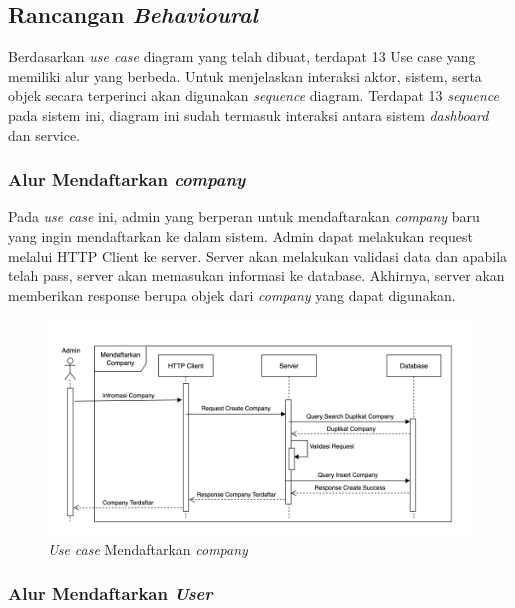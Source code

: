 \subsection{Rancangan \textit{Behavioural}}
\label{subsec:arsitektur-behavioural}

Berdasarkan \textit{use case} diagram yang telah dibuat, terdapat 13 Use case yang memiliki alur yang berbeda. Untuk menjelaskan interaksi aktor, sistem, serta objek secara terperinci akan digunakan \textit{sequence} diagram. Terdapat 13 \textit{sequence} pada sistem ini, diagram ini sudah termasuk interaksi antara sistem \textit{dashboard} dan service.

\subsubsection{Alur Mendaftarkan \textit{company}}

Pada \textit{use case} ini, admin yang berperan untuk mendaftarakan \textit{company} baru yang ingin mendaftarkan ke dalam sistem. Admin dapat melakukan request melalui HTTP Client ke server. Server akan melakukan validasi data dan apabila telah pass, server akan memasukan informasi ke database. Akhirnya, server akan memberikan response berupa objek dari \textit{company} yang dapat digunakan.

\begin{figure}
  \centering
  \includegraphics[width=1\textwidth]{resources/chapter-3/usecase/uc-01.jpg}
  \caption{\textit{Use case} Mendaftarkan \textit{company}}
  \label{fig:usecase-01}
\end{figure}

\pagebreak

\subsubsection{Alur Mendaftarkan \textit{User}}


